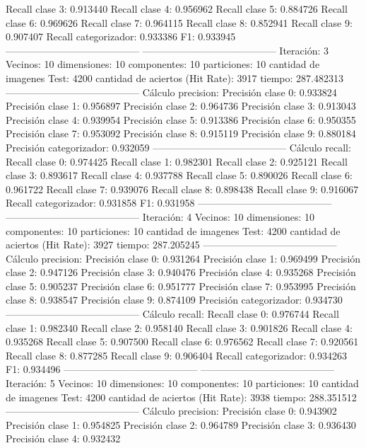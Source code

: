 Recall clase 3: 0.913440
Recall clase 4: 0.956962
Recall clase 5: 0.884726
Recall clase 6: 0.969626
Recall clase 7: 0.964115
Recall clase 8: 0.852941
Recall clase 9: 0.907407
Recall categorizador: 0.933386
F1: 0.933945
-----------------------------------------
-----------------------------------------
Iteración: 3
Vecinos: 10
dimensiones: 10
componentes: 10
particiones: 10
cantidad de imagenes Test: 4200
cantidad de aciertos (Hit Rate): 3917
tiempo: 287.482313
-----------------------------------------
Cálculo precision: 
Precisión clase 0: 0.933824
Precisión clase 1: 0.956897
Precisión clase 2: 0.964736
Precisión clase 3: 0.913043
Precisión clase 4: 0.939954
Precisión clase 5: 0.913386
Precisión clase 6: 0.950355
Precisión clase 7: 0.953092
Precisión clase 8: 0.915119
Precisión clase 9: 0.880184
Precisión categorizador: 0.932059
-----------------------------------------
Cálculo recall: 
Recall clase 0: 0.974425
Recall clase 1: 0.982301
Recall clase 2: 0.925121
Recall clase 3: 0.893617
Recall clase 4: 0.937788
Recall clase 5: 0.890026
Recall clase 6: 0.961722
Recall clase 7: 0.939076
Recall clase 8: 0.898438
Recall clase 9: 0.916067
Recall categorizador: 0.931858
F1: 0.931958
-----------------------------------------
-----------------------------------------
Iteración: 4
Vecinos: 10
dimensiones: 10
componentes: 10
particiones: 10
cantidad de imagenes Test: 4200
cantidad de aciertos (Hit Rate): 3927
tiempo: 287.205245
-----------------------------------------
Cálculo precision: 
Precisión clase 0: 0.931264
Precisión clase 1: 0.969499
Precisión clase 2: 0.947126
Precisión clase 3: 0.940476
Precisión clase 4: 0.935268
Precisión clase 5: 0.905237
Precisión clase 6: 0.951777
Precisión clase 7: 0.953995
Precisión clase 8: 0.938547
Precisión clase 9: 0.874109
Precisión categorizador: 0.934730
-----------------------------------------
Cálculo recall: 
Recall clase 0: 0.976744
Recall clase 1: 0.982340
Recall clase 2: 0.958140
Recall clase 3: 0.901826
Recall clase 4: 0.935268
Recall clase 5: 0.907500
Recall clase 6: 0.976562
Recall clase 7: 0.920561
Recall clase 8: 0.877285
Recall clase 9: 0.906404
Recall categorizador: 0.934263
F1: 0.934496
-----------------------------------------
-----------------------------------------
Iteración: 5
Vecinos: 10
dimensiones: 10
componentes: 10
particiones: 10
cantidad de imagenes Test: 4200
cantidad de aciertos (Hit Rate): 3938
tiempo: 288.351512
-----------------------------------------
Cálculo precision: 
Precisión clase 0: 0.943902
Precisión clase 1: 0.954825
Precisión clase 2: 0.964789
Precisión clase 3: 0.936430
Precisión clase 4: 0.932432
